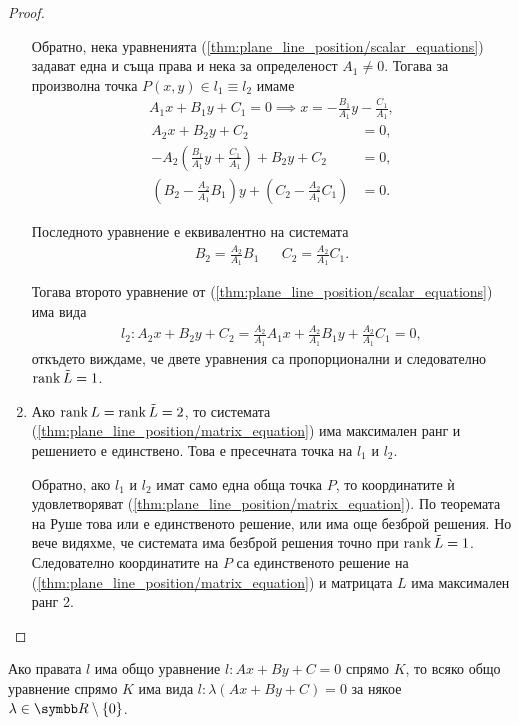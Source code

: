 \documentclass[numbers=endperiod, bibliography=totocnumbered]{scrartcl}
\begin{document}
\begin{proof}
\begin{enumerate}
    Обратно, нека уравненията (\ref{thm:plane_line_position/scalar_equations}) задават една и съща права и нека за определеност \( A_1 \neq 0 \). Тогава за произволна точка \( P(x, y) \in l_1 \equiv l_2 \) имаме
    \begin{align*}
      A_1x + B_1y + C_1 = 0
      \implies
      x = - \frac {B_1} {A_1} y - \frac {C_1} {A_1},
    \end{align*}
    \begin{align*}
      A_2x + B_2y + C_2 &= 0,
      \\
      - A_2 \left(\frac {B_1} {A_1} y + \frac {C_1} {A_1} \right) + B_2y + C_2 &= 0,
      \\
      \left(B_2 - \frac {A_2} {A_1} B_1 \right) y + \left(C_2 - \frac {A_2} {A_1} C_1 \right) &= 0.
    \end{align*}

    Последното уравнение е еквивалентно на системата
    \begin{align*}
      B_2 = \frac {A_2} {A_1} B_1
      &&
      C_2 = \frac {A_2} {A_1} C_1.
    \end{align*}

    Тогава второто уравнение от (\ref{thm:plane_line_position/scalar_equations}) има вида
    \begin{align*}
      l_2:
      A_2 x + B_2 y + C_2 =
      \frac {A_2} {A_1} A_1 x + \frac {A_2} {A_1} B_1 y + \frac {A_2} {A_1} C_1
      = 0,
    \end{align*}
    откъдето виждаме, че двете уравнения са пропорционални и следователно \( \operatorname{rank} \tilde L = 1 \).

    \item Ако \( \operatorname{rank} L = \operatorname{rank} \tilde L = 2 \), то системата (\ref{thm:plane_line_position/matrix_equation}) има максимален ранг и решението е единствено. Това е пресечната точка на \( l_1 \) и \( l_2 \).

    Обратно, ако \( l_1 \) и \( l_2 \) имат само една обща точка \( P \), то координатите ѝ удовлетворяват (\ref{thm:plane_line_position/matrix_equation}). По теоремата на Руше това или е единственото решение, или има още безброй решения. Но вече видяхме, че системата има безброй решения точно при \( \operatorname{rank} \tilde L = 1 \). Следователно координатите на \( P \) са единственото решение на (\ref{thm:plane_line_position/matrix_equation}) и матрицата \( L \) има максимален ранг 2.
  \end{enumerate}
\end{proof}

\begin{corollary}
  Ако правата \( l \) има общо уравнение \( l: Ax + By + C = 0 \) спрямо \( K \), то всяко общо уравнение спрямо \( K \) има вида \( l: \lambda(Ax + By + C) = 0 \) за някое \( \lambda \in \R \setminus \{ 0 \} \).
\end{corollary}
\end{document}
